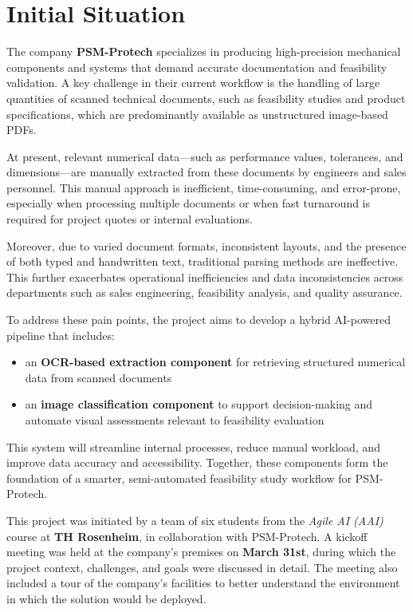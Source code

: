 \section{Initial Situation}

The company \textbf{PSM-Protech} specializes in producing high-precision mechanical components and systems that demand accurate documentation and feasibility validation. A key challenge in their current workflow is the handling of large quantities of scanned technical documents, such as feasibility studies and product specifications, which are predominantly available as unstructured image-based PDFs.

At present, relevant numerical data—such as performance values, tolerances, and dimensions—are manually extracted from these documents by engineers and sales personnel. This manual approach is inefficient, time-consuming, and error-prone, especially when processing multiple documents or when fast turnaround is required for project quotes or internal evaluations.

Moreover, due to varied document formats, inconsistent layouts, and the presence of both typed and handwritten text, traditional parsing methods are ineffective. This further exacerbates operational inefficiencies and data inconsistencies across departments such as sales engineering, feasibility analysis, and quality assurance.

To address these pain points, the project aims to develop a hybrid AI-powered pipeline that includes:
\begin{itemize}
    \item an \textbf{OCR-based extraction component} for retrieving structured numerical data from scanned documents
    \item an \textbf{image classification component} to support decision-making and automate visual assessments relevant to feasibility evaluation
\end{itemize}

This system will streamline internal processes, reduce manual workload, and improve data accuracy and accessibility. Together, these components form the foundation of a smarter, semi-automated feasibility study workflow for PSM-Protech.

This project was initiated by a team of six students from the \textit{Agile AI (AAI)} course at \textbf{TH Rosenheim}, in collaboration with PSM-Protech. A kickoff meeting was held at the company's premises on \textbf{March 31st}, during which the project context, challenges, and goals were discussed in detail. The meeting also included a tour of the company's facilities to better understand the environment in which the solution would be deployed.

